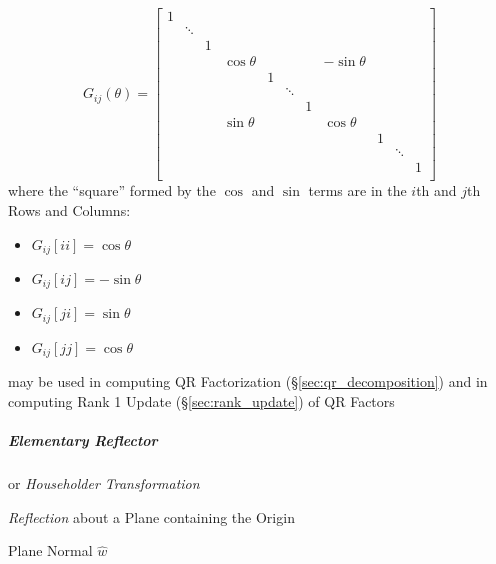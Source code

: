 \[
  G_{ij}(\theta) = \begin{bmatrix}
    1 &        &   &            &   &        &   &             &   &        &   \\
      & \ddots &   &            &   &        &   &             &   &        &   \\
      &        & 1 &            &   &        &   &             &   &        &   \\
      &        &   & \cos\theta &   &        &   & -\sin\theta &   &        &   \\
      &        &   &            & 1 &        &   &             &   &        &   \\
      &        &   &            &   & \ddots &   &             &   &        &   \\
      &        &   &            &   &        & 1 &             &   &        &   \\
      &        &   & \sin\theta &   &        &   & \cos\theta  &   &        &   \\
      &        &   &            &   &        &   &             & 1 &        &   \\
      &        &   &            &   &        &   &             &   & \ddots &   \\
      &        &   &            &   &        &   &             &   &        & 1 \\
  \end{bmatrix}
\]
where the ``square'' formed by the $\cos$ and $\sin$ terms are in the $i$th and
$j$th Rows and Columns:
\begin{itemize}
  \item $G_{ij}[ii] = \cos\theta$
  \item $G_{ij}[ij] = -\sin\theta$
  \item $G_{ij}[ji] = \sin\theta$
  \item $G_{ij}[jj] = \cos\theta$
\end{itemize}

\fist may be used in computing QR Factorization (\S\ref{sec:qr_decomposition})
and in computing Rank 1 Update (\S\ref{sec:rank_update}) of QR Factors



\subparagraph{Elementary Reflector}\label{sec:elementary_reflector}\hfill

or \emph{Householder Transformation}

\emph{Reflection} about a Plane containing the Origin

Plane Normal $\hat{w}$

